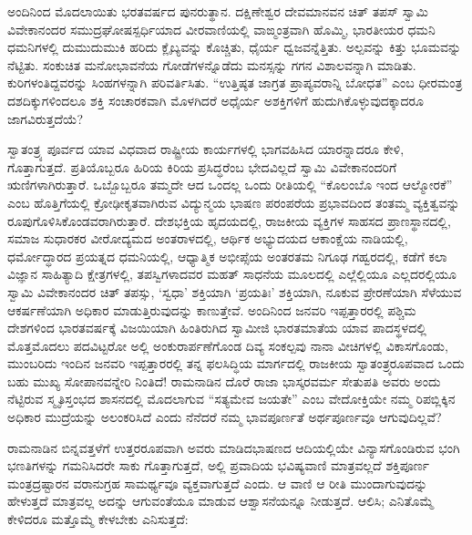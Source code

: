 \vskip 1pt

ಅಂದಿನಿಂದ ಮೊದಲಾಯಿತು ಭರತವರ್ಷದ ಪುನರುತ್ಥಾನ. ದಕ್ಷಿಣೇಶ್ವರ ದೇವಮಾನವನ ಚಿತ್​ ತಪಸ್​ ಸ್ವಾಮಿ ವಿವೇಕಾನಂದರ ಸಮುದ್ರಘೋಷ\break ಸ್ಪರ್ಧಿಯಾದ ವೀರವಾಣಿಯಲ್ಲಿ ವಾಙ್ಮಂತ್ರವಾಗಿ ಹೊಮ್ಮಿ, ಭಾರತೀಯರ ಧಮನಿ ಧಮನಿಗಳಲ್ಲಿ ದುಮುದುಮುಕಿ ಹರಿದು ಕ್ಲೈಬ್ಯವನ್ನು ಕೊಚ್ಚಿತು, ಧೈರ್ಯ ಧ್ವಜವನ್ನೆತ್ತಿತು. ಅಲ್ಪವನ್ನು ಕಿತ್ತು ಭೂಮವನ್ನು ನೆಟ್ಟಿತು. ಸಂಕುಚಿತ ಮನೋಭಾವನೆಯ ಗೋಡೆಗಳನ್ನೊಡೆದು ಮನಸ್ಸನ್ನು ಗಗನ ವಿಶಾಲವನ್ನಾಗಿ ಮಾಡಿತು. ಕುರಿಗಳಂತಿದ್ದವರನ್ನು ಸಿಂಹಗಳನ್ನಾಗಿ ಪರಿವರ್ತಿಸಿತು. “ಉತ್ತಿಷ್ಠತ ಜಾಗ್ರತ ಪ್ರಾಪ್ಯವರಾನ್ನಿ ಬೋಧತ” ಎಂಬ ಧೀರಮಂತ್ರ ದಶದಿಕ್ಕುಗಳಿಂದಲೂ ಶಕ್ತಿ ಸಂಚಾರಕವಾಗಿ ಮೊಳಗಿದರೆ ಅಧೈರ್ಯ ಅಶಕ್ತಿಗಳಿಗೆ ಹುದುಗಿಕೊಳ್ಳುವುದಕ್ಕಾದರೂ ಜಾಗವಿರುತ್ತದೆಯೆ?

ಸ್ವಾತಂತ್ರ್ಯ ಪೂರ್ವದ ಯಾವ ವಿಧವಾದ ರಾಷ್ಟ್ರೀಯ ಕಾರ್ಯಗಳಲ್ಲಿ ಭಾಗವಹಿಸಿದ ಯಾರನ್ನಾದರೂ ಕೇಳಿ, ಗೊತ್ತಾಗುತ್ತದೆ. ಪ್ರತಿಯೊಬ್ಬರೂ ಹಿರಿಯ ಕಿರಿಯ ಪ್ರಸಿದ್ಧರೆಂಬ ಭೇದವಿಲ್ಲದೆ ಸ್ವಾಮಿ ವಿವೇಕಾನಂದರಿಗೆ ಋಣಿಗಳಾಗಿರುತ್ತಾರೆ. ಒಬ್ಬೊಬ್ಬರೂ ತಮ್ಮದೇ ಆದ ಒಂದಲ್ಲ ಒಂದು ರೀತಿಯಲ್ಲಿ “ಕೊಲಂಬೊ ಇಂದ ಆಲ್ಮೋರಕೆ” ಎಂಬ ಹೊತ್ತಿಗೆಯಲ್ಲಿ ಕ್ರೋಢೀಕೃತವಾಗಿರುವ ವಿದ್ಯುನ್ಮಯ ಭಾಷಣ ಪರಂಪರೆಯ ಪ್ರಭಾವದಿಂದ ತಂತಮ್ಮ ವ್ಯಕ್ತಿತ್ವವನ್ನು ರೂಪುಗೊಳಿಸಿಕೊಂಡವರಾಗಿರುತ್ತಾರೆ. ದೇಶಭಕ್ತಿಯ ಹೃದಯದಲ್ಲಿ, ರಾಜಕೀಯ ವ್ಯಕ್ತಿಗಳ ಸಾಹಸದ ಪ್ರಾಣಸ್ಥಾನದಲ್ಲಿ, ಸಮಾಜ ಸುಧಾರಕರ ವೀರೋದ್ಯಮದ ಅಂತರಾಳದಲ್ಲಿ, ಆರ್ಥಿಕ ಅಭ್ಯುದಯದ ಆಕಾಂಕ್ಷೆಯ ನಾಡಿಯಲ್ಲಿ, ಧರ್ಮೋದ್ಧಾರದ ಪ್ರಯತ್ನದ ಧಮನಿಯಲ್ಲಿ, ಆಧ್ಯಾತ್ಮಿಕ ಅಭೀಪ್ಸೆಯ ಅಂತರತಮ ನಿಗೂಢ ಗಹ್ವರದಲ್ಲಿ, ಕಡೆಗೆ ಕಲಾ ವಿಜ್ಞಾನ ಸಾಹಿತ್ಯಾದಿ ಕ್ಷೇತ್ರಗಳಲ್ಲಿ, ತಪಸ್ವಿಗಳಾದವರ ಮಹತ್​ ಸಾಧನೆಯ ಮೂಲದಲ್ಲಿ ಎಲ್ಲೆಲ್ಲಿಯೂ ಎಲ್ಲದರಲ್ಲಿಯೂ ಸ್ವಾಮಿ ವಿವೇಕಾನಂದರ ಚಿತ್​ ತಪಸ್ಸು, ‘ಸ್ವಧಾ’ ಶಕ್ತಿಯಾಗಿ ‘ಪ್ರಯತಿಃ’ ಶಕ್ತಿಯಾಗಿ, ನೂಕುವ ಪ್ರೇರಣೆಯಾಗಿ ಸೆಳೆಯುವ ಆಕರ್ಷಣೆಯಾಗಿ ಅಧಿಕಾರ ಮಾಡುತ್ತಿರುವುದನ್ನು ಕಾಣುತ್ತೇವೆ. ಅಂದಿನಿಂದ ಜನವರಿ ಇಪ್ಪತ್ತಾರರಲ್ಲಿ ಪಶ್ಚಿಮ ದೇಶಗಳಿಂದ ಭಾರತವರ್ಷಕ್ಕೆ ವಿಜಯಿಯಾಗಿ ಹಿಂತಿರುಗಿದ ಸ್ವಾಮೀಜಿ ಭಾರತಮಾತೆಯ ಯಾವ ಪಾದಸ್ಥಳದಲ್ಲಿ ಮೊತ್ತಮೊದಲು ಪದವಿಟ್ಟರೋ ಅಲ್ಲಿ ಅಂಕುರಾರ್ಪಣೆಗೊಂಡ ದಿವ್ಯ ಸಂಕಲ್ಪವು ನಾನಾ ವೀಚಿಗಳಲ್ಲಿ ವಿಕಾಸಗೊಂಡು, ಮುಂಬರಿದು ಇಂದಿನ ಜನವರಿ ಇಪ್ಪತ್ತಾರರಲ್ಲಿ ತನ್ನ ಫಲಸಿದ್ಧಿಯ ಮಾರ್ಗದಲ್ಲಿ ರಾಜಕೀಯ ಸ್ವಾತಂತ್ರ್ಯರೂಪವಾದ ಒಂದು ಬಹು ಮುಖ್ಯ ಸೋಪಾನವನ್ನೇರಿ ನಿಂತಿದೆ! ರಾಮನಾಡಿನ ದೊರೆ ರಾಜಾ ಭಾಸ್ಕರವರ್ಮ ಸೇತುಪತಿ ಅವರು ಅಂದು ನೆಟ್ಟಿರುವ ಸ್ಮೃತಿಸ್ತಂಭದ ಶಾಸನದಲ್ಲಿ ಮೊದಲಾಗುವ “ಸತ್ಯಮೇವ ಜಯತೇ” ಎಂಬ ವೇದೋಕ್ತಿಯೇ ನಮ್ಮ ರಿಪಬ್ಲಿಕ್ಕಿನ ಅಧಿಕಾರ ಮುದ್ರೆಯನ್ನು ಅಲಂಕರಿಸಿದೆ ಎಂದು ನೆನೆದರೆ ನಮ್ಮ ಭಾವಪೂರ್ಣತೆ ಅರ್ಥಪೂರ್ಣವೂ ಆಗುವುದಿಲ್ಲವೆ?

ರಾಮನಾಡಿನ ಬಿನ್ನವತ್ತಳೆಗೆ ಉತ್ತರರೂಪವಾಗಿ ಅವರು ಮಾಡಿದ\break ಭಾಷಣದ ಆದಿಯಲ್ಲಿಯೇ ವಿನ್ಯಾಸಗೊಂಡಿರುವ ಭಂಗಿ ಭಣತಿಗಳನ್ನು ಗಮನಿ\-ಸಿದರೇ ಸಾಕು ಗೊತ್ತಾಗುತ್ತದೆ, ಅಲ್ಲಿ ಪ್ರವಾದಿಯ ಭವಿಷ್ಯವಾಣಿ ಮಾತ್ರವಲ್ಲದೆ ಶಕ್ತಿಪೂರ್ಣ ಮಂತ್ರದ್ರಷ್ಟಾರನ ವರಾನುಗ್ರಹ ಸಾಮರ್ಥ್ಯವೂ ವ್ಯಕ್ತವಾಗುತ್ತದೆ ಎಂದು. ಆ ವಾಣಿ ಆ ರೀತಿ ಮುಂದಾಗುವುದನ್ನು ಹೇಳುತ್ತದೆ ಮಾತ್ರವಲ್ಲ ಅದನ್ನು ಆಗುವಂತೆಯೂ ಮಾಡುವ ಆಶ್ವಾಸನೆಯನ್ನೂ ನೀಡುತ್ತದೆ. ಆಲಿಸಿ; ಎನಿತೊಮ್ಮೆ ಕೇಳಿದರೂ ಮತ್ತೊಮ್ಮೆ ಕೇಳಬೇಕು ಎನಿಸುತ್ತದೆ:

